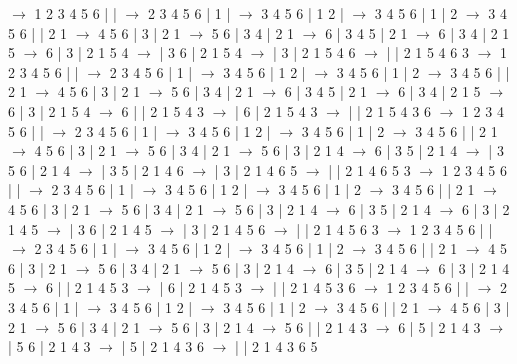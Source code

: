 \documentclass{article}
\begin{document}
\newline
 $\rightarrow$ 1 2 3 4 5 6 |  |  $\rightarrow$ 2 3 4 5 6 | 1 |  $\rightarrow$ 3 4 5 6 | 1 2 |  $\rightarrow$ 3 4 5 6 | 1 | 2 $\rightarrow$ 3 4 5 6 |  | 2 1 $\rightarrow$ 4 5 6 | 3 | 2 1 $\rightarrow$ 5 6 | 3 4 | 2 1 $\rightarrow$ 6 | 3 4 5 | 2 1 $\rightarrow$ 6 | 3 4 | 2 1 5 $\rightarrow$ 6 | 3 | 2 1 5 4 $\rightarrow$  | 3 6 | 2 1 5 4 $\rightarrow$  | 3 | 2 1 5 4 6 $\rightarrow$  |  | 2 1 5 4 6 3
\newline
 $\rightarrow$ 1 2 3 4 5 6 |  |  $\rightarrow$ 2 3 4 5 6 | 1 |  $\rightarrow$ 3 4 5 6 | 1 2 |  $\rightarrow$ 3 4 5 6 | 1 | 2 $\rightarrow$ 3 4 5 6 |  | 2 1 $\rightarrow$ 4 5 6 | 3 | 2 1 $\rightarrow$ 5 6 | 3 4 | 2 1 $\rightarrow$ 6 | 3 4 5 | 2 1 $\rightarrow$ 6 | 3 4 | 2 1 5 $\rightarrow$ 6 | 3 | 2 1 5 4 $\rightarrow$ 6 |  | 2 1 5 4 3 $\rightarrow$  | 6 | 2 1 5 4 3 $\rightarrow$  |  | 2 1 5 4 3 6
\newline
 $\rightarrow$ 1 2 3 4 5 6 |  |  $\rightarrow$ 2 3 4 5 6 | 1 |  $\rightarrow$ 3 4 5 6 | 1 2 |  $\rightarrow$ 3 4 5 6 | 1 | 2 $\rightarrow$ 3 4 5 6 |  | 2 1 $\rightarrow$ 4 5 6 | 3 | 2 1 $\rightarrow$ 5 6 | 3 4 | 2 1 $\rightarrow$ 5 6 | 3 | 2 1 4 $\rightarrow$ 6 | 3 5 | 2 1 4 $\rightarrow$  | 3 5 6 | 2 1 4 $\rightarrow$  | 3 5 | 2 1 4 6 $\rightarrow$  | 3 | 2 1 4 6 5 $\rightarrow$  |  | 2 1 4 6 5 3
\newline
 $\rightarrow$ 1 2 3 4 5 6 |  |  $\rightarrow$ 2 3 4 5 6 | 1 |  $\rightarrow$ 3 4 5 6 | 1 2 |  $\rightarrow$ 3 4 5 6 | 1 | 2 $\rightarrow$ 3 4 5 6 |  | 2 1 $\rightarrow$ 4 5 6 | 3 | 2 1 $\rightarrow$ 5 6 | 3 4 | 2 1 $\rightarrow$ 5 6 | 3 | 2 1 4 $\rightarrow$ 6 | 3 5 | 2 1 4 $\rightarrow$ 6 | 3 | 2 1 4 5 $\rightarrow$  | 3 6 | 2 1 4 5 $\rightarrow$  | 3 | 2 1 4 5 6 $\rightarrow$  |  | 2 1 4 5 6 3
\newline
 $\rightarrow$ 1 2 3 4 5 6 |  |  $\rightarrow$ 2 3 4 5 6 | 1 |  $\rightarrow$ 3 4 5 6 | 1 2 |  $\rightarrow$ 3 4 5 6 | 1 | 2 $\rightarrow$ 3 4 5 6 |  | 2 1 $\rightarrow$ 4 5 6 | 3 | 2 1 $\rightarrow$ 5 6 | 3 4 | 2 1 $\rightarrow$ 5 6 | 3 | 2 1 4 $\rightarrow$ 6 | 3 5 | 2 1 4 $\rightarrow$ 6 | 3 | 2 1 4 5 $\rightarrow$ 6 |  | 2 1 4 5 3 $\rightarrow$  | 6 | 2 1 4 5 3 $\rightarrow$  |  | 2 1 4 5 3 6
\newline
 $\rightarrow$ 1 2 3 4 5 6 |  |  $\rightarrow$ 2 3 4 5 6 | 1 |  $\rightarrow$ 3 4 5 6 | 1 2 |  $\rightarrow$ 3 4 5 6 | 1 | 2 $\rightarrow$ 3 4 5 6 |  | 2 1 $\rightarrow$ 4 5 6 | 3 | 2 1 $\rightarrow$ 5 6 | 3 4 | 2 1 $\rightarrow$ 5 6 | 3 | 2 1 4 $\rightarrow$ 5 6 |  | 2 1 4 3 $\rightarrow$ 6 | 5 | 2 1 4 3 $\rightarrow$  | 5 6 | 2 1 4 3 $\rightarrow$  | 5 | 2 1 4 3 6 $\rightarrow$  |  | 2 1 4 3 6 5
\end{document}
